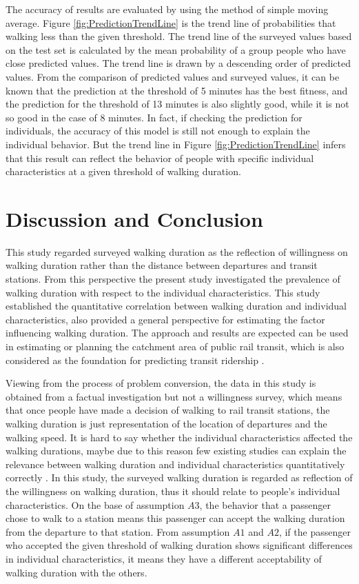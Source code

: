 \documentclass[Journal,letterpaper]{ascelike-new}
\begin{document}
%
The accuracy of results are evaluated by using the method of simple moving average. Figure \ref{fig:PredictionTrendLine} is the trend line of probabilities that walking less than the given threshold. The trend line of the surveyed values based on the test set is calculated by the mean probability of a group people who have close predicted values. The trend line is drawn by a descending order of predicted values. From the comparison of predicted values and surveyed values, it can be known that the prediction at the threshold of 5 minutes has the best fitness, and the prediction for the threshold of 13 minutes is also slightly good, while it is not so good in the case of 8 minutes. In fact, if checking the prediction for individuals, the accuracy of this model is still not enough to explain the individual behavior. But the trend line in Figure \ref{fig:PredictionTrendLine} infers that this result can reflect the behavior of people with specific individual characteristics at a given threshold of walking duration. 

\section{Discussion and Conclusion}
This study regarded surveyed walking duration as the reflection of willingness on walking duration rather than the distance between departures and transit stations. From this perspective the present study investigated the prevalence of walking duration with respect to the individual characteristics. This study established the quantitative correlation between walking duration and individual characteristics, also provided a general perspective for estimating the factor influencing walking duration. The approach and results are expected can be used in estimating or planning the catchment area of public rail transit, which is also considered as the foundation for predicting transit ridership \cite{guerra2013half}.

% 
Viewing from the process of problem conversion, the data in this study is obtained from a factual investigation but not a willingness survey, which means that once people have made a decision of walking to rail transit stations, the walking duration is just representation of the location of departures and the walking speed. It is hard to say whether the individual characteristics affected the walking durations, maybe due to this reason few existing studies can explain the relevance between walking duration and individual characteristics quantitatively correctly \cite{krygsman2004multimodal,levtnson1997density,daniels2013explaining}. In this study, the surveyed walking duration is regarded as reflection of the willingness on walking duration, thus it should relate to people's individual characteristics. On the base of assumption $A3$, the behavior that a passenger chose to walk to a station means this passenger can accept the walking duration from the departure to that station. From assumption $A1$ and $A2$, if the passenger who accepted the given threshold of walking duration shows significant differences in individual characteristics, it means they have a different acceptability of walking duration with the others.
\end{document}
